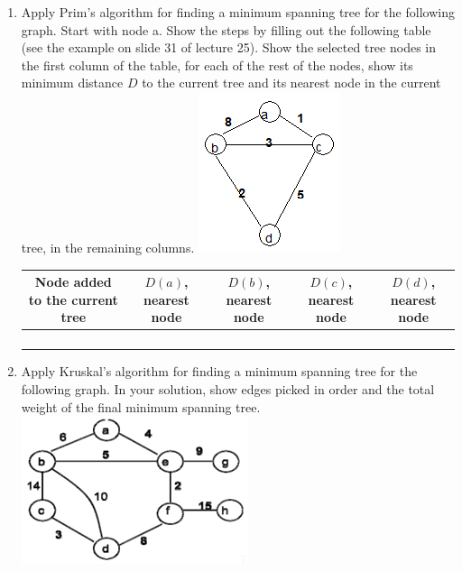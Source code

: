 \documentclass{article}
\begin{document}
\begin{enumerate}
    \item Apply Prim's algorithm for finding a minimum spanning tree for the 
    following graph. Start with node a. Show the steps by filling out the 
    following table (see the example on slide 31 of lecture 25). Show the 
    selected tree nodes in the first column of the table, for each of the rest 
    of the nodes, show its minimum distance $D$ to the current tree and its 
    nearest node in the current tree, in the remaining columns.\newline
    \includegraphics[scale=0.75]{p4_graph}\newline
    \begin{tabular}{|c |c |c |c |c|}
        \hline
        Node added to the current tree & $D(a)$, nearest node & $D(b)$, 
        nearest node & $D(c)$, nearest node & $D(d)$, nearest node\\
        \hline
        & & & &\\
        \hline
        & & & &\\
        \hline
        & & & &\\
        \hline
        & & & &\\
        \hline
    \end{tabular}
    
    \item Apply Kruskal’s algorithm for finding a minimum spanning tree for 
    the following graph. In your solution, show edges picked in order and the 
    total weight of the final minimum spanning tree.\newline
    \includegraphics[scale=0.75]{p5_graph}\newline


\end{enumerate}
\end{document}
